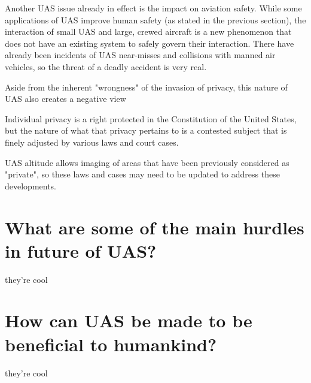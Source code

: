 \documentclass[]{aiaa-tc}%
\begin{document}
Another UAS issue already in effect is the impact on aviation safety.  While some applications of UAS improve human safety (as stated in the previous section), the interaction of small UAS and large, crewed aircraft is a new phenomenon that does not have an existing system to safely govern their interaction.  There have already been incidents of UAS near-misses and collisions with manned air vehicles, so the threat of a deadly accident is very real.



Aside from the inherent "wrongness" of the invasion of privacy, this nature of UAS also creates a negative view

Individual privacy is a right protected in the Constitution of the United States, but the nature of what that privacy pertains to is a contested subject that is finely adjusted by various laws and court cases.




 UAS altitude allows imaging of areas that have been previously considered as "private", so these laws and cases may need to be updated to address these developments.

\section*{What are some of the main hurdles in future of UAS?}

they're cool

\section*{How can UAS be made to be beneficial to humankind?}

they're cool
\end{document}
